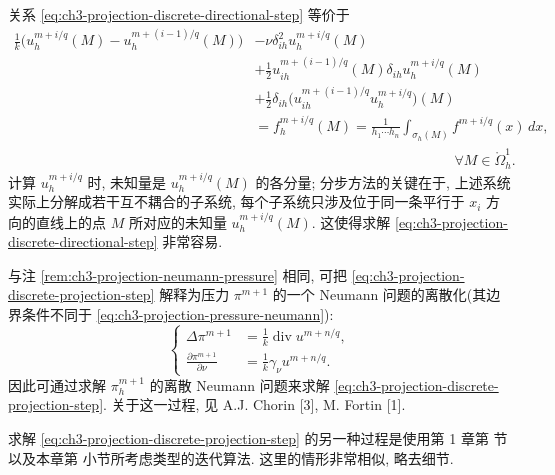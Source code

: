 \begin{Remark}
\label{rem:ch3-projection-directional-resolution}
关系 \eqref{eq:ch3-projection-discrete-directional-step} 等价于
\[
\begin{aligned}
\frac1k\bigl(u_h^{m+i/q}(M)-u_h^{m+(i-1)/q}(M)\bigr)
&-\nu\delta_{ih}^2u_h^{m+i/q}(M)\\
&+\frac12u_{ih}^{m+(i-1)/q}(M)\delta_{ih}u_h^{m+i/q}(M)\\
&+\frac12\delta_{ih}\bigl(u_{ih}^{m+(i-1)/q}u_h^{m+i/q}\bigr)(M)\\
&=f_h^{m+i/q}(M)
=\frac1{h_1\cdots h_n}\int_{\sigma_h(M)}f^{m+i/q}(x)\,dx,\\
&\hspace{6cm}\forall M\in\mathring\Omega_h^1.
\end{aligned}
\]
计算 $u_h^{m+i/q}$ 时, 未知量是 $u_h^{m+i/q}(M)$ 的各分量; 分步方法的关键在于, 上述系统实际上分解成若干互不耦合的子系统, 每个子系统只涉及位于同一条平行于 $x_i$ 方向的直线上的点 $M$ 所对应的未知量 $u_h^{m+i/q}(M)$. 这使得求解 \eqref{eq:ch3-projection-discrete-directional-step} 非常容易.
\end{Remark}

\begin{Remark}
\label{rem:ch3-projection-discrete-neumann}
与注 \ref{rem:ch3-projection-neumann-pressure} 相同, 可把 \eqref{eq:ch3-projection-discrete-projection-step} 解释为压力 $\pi^{m+1}$ 的一个 Neumann 问题的离散化(其边界条件不同于 \eqref{eq:ch3-projection-pressure-neumann}):
\begin{equation}
\left\{
\begin{aligned}
\Delta\pi^{m+1}&=\frac1k\operatorname{div}u^{m+n/q},\\
\frac{\partial\pi^{m+1}}{\partial\nu}
&=\frac1k\gamma_\nu u^{m+n/q}.
\end{aligned}
\right.
\label{eq:ch3-projection-discrete-neumann-problem}
\end{equation}
因此可通过求解 $\pi_h^{m+1}$ 的离散 Neumann 问题来求解 \eqref{eq:ch3-projection-discrete-projection-step}. 关于这一过程, 见 A.J. Chorin [3], M. Fortin [1].

求解 \eqref{eq:ch3-projection-discrete-projection-step} 的另一种过程是使用第 1 章第  节以及本章第  小节所考虑类型的迭代算法. 这里的情形非常相似, 略去细节.
\end{Remark}

